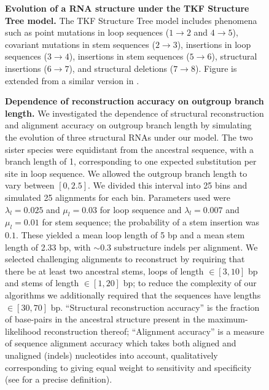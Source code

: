 \documentclass[10pt]{article}
\begin{document}
\begin{figure}[!ht]
  \centering
  \caption{
    \textbf{Evolution of a RNA structure under the TKF Structure Tree
      model.}
    The TKF Structure Tree model includes phenomena such as point
    mutations in loop sequences ($1 \rightarrow 2$ and $4 \rightarrow 5$), covariant
    mutations in stem sequences ($2 \rightarrow 3$), insertions in
    loop sequences ($3 \rightarrow 4$), insertions in stem sequences
    ($5 \rightarrow 6$), structural insertions ($6 \rightarrow 7$),
    and structural deletions ($7 \rightarrow 8$).
   Figure is extended from a similar version in \cite{Holmes2004}.
  }
\end{figure}

\begin{figure}[!ht]
  \centering
  \caption{
    \textbf{Dependence of reconstruction accuracy on outgroup branch
      length.}
    We investigated the dependence of structural reconstruction and
    alignment accuracy on outgroup branch length by simulating the
    evolution of three structural RNAs under our model.  The two
    sister species were equidistant from the ancestral sequence, with
    a branch length of 1, corresponding to one expected
    substitution per site in loop sequence.  We allowed the outgroup
    branch length to vary between $[0, 2.5]$.  We divided this interval
    into 25 bins and simulated 25 alignments for each bin.
    Parameters used were $\lambda_l = 0.025$ and $\mu_l = 0.03$ for
    loop sequence and $\lambda_l = 0.007$ and $\mu_l = 0.01$ for stem
    sequence; the probability of a stem insertion was $0.1$.  These
    yielded a mean loop length of 5 bp and a mean stem length of 2.33 bp,
    with $\sim 0.3$ substructure indels per alignment.
    We selected challenging alignments to reconstruct by requiring
    that there be at least two ancestral stems, loops of length $\in [3,
    10]$ bp and stems of length $\in [1, 20]$ bp; to reduce the complexity of
    our algorithms we additionally required that the sequences have
    lengths $\in [30, 70]$ bp.
    ``Structural reconstruction accuracy'' is the fraction of
    base-pairs in the ancestral structure present in the
    maximum-likelihood reconstruction thereof; ``Alignment accuracy''
    is a measure of sequence alignment accuracy which takes both
    aligned and unaligned (indels) nucleotides into account,
    qualitatively corresponding to giving equal weight to sensitivity
    and specificity (see
    \cite{SchwartzMyersPachter2006} for a precise definition).
}
\end{figure}
\end{document}
